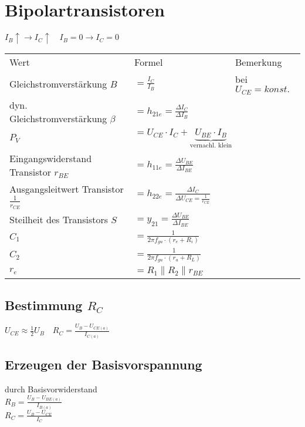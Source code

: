     \section{Bipolartransistoren}
    \noindent
    $I_B\uparrow\rightarrow I_C\uparrow\quad I_B=0\rightarrow I_C=0$
    \renewcommand{\arraystretch}{1.0}
    \begin{table}[H]
        \begin{tabularx}{\columnwidth}{l l l}
            Wert & Formel & Bemerkung \\
            Gleichstromverstärkung $B$ & $=\frac{I_C}{I_B}$ & bei $U_{CE}=konst.$ \\
            dyn. Gleichstromverstärkung $\beta$ & $=h_{21e}=\frac{\Delta I_C}{\Delta I_B}$ & \\
            $P_V$ & $=U_{CE}\cdot I_C + \underbrace{U_{BE}\cdot I_B}_\text{vernachl. klein}$ & \\
            Eingangswiderstand Transistor $r_{BE}$ & $=h_{11e}=\frac{\Delta U_{BE}}{\Delta I_{BE}}$ & \\
            Ausgangsleitwert Transistor $\frac{1}{r_{CE}}$ & $=h_{22e}=\frac{\Delta I_C}{\Delta U_{CE}=\frac{1}{r_{CE}}}$ & \\
            Steilheit des Transistors $S$ & $=y_{21}=\frac{\Delta U_{BE}}{\Delta I_{BE}}$ & \\
            $C_1$ & $=\frac{1}{2\pi f_{gu}\cdot (r_e+R_i)}$ & \\
            $C_2$ & $=\frac{1}{2\pi f_{gu}\cdot (r_a+R_L)}$ & \\
            $r_e$ & $=R_1\parallel R_2\parallel r_{BE}$
        \end{tabularx}
    \end{table}
    \subsection{Bestimmung $R_C$}
    $U_{CE}\approx \frac{1}{2}U_B\quad R_C=\frac{U_B-U_{CE(a)}}{I_{C(a)}}$

    \subsection{Erzeugen der Basisvorspannung}
    \begin{minipage}{0.5\columnwidth}
        durch Basisvorwiderstand\\
        $R_B=\frac{U_B-U_{BE(a)}}{I_{B(a)}}$\\ %
        $R_C=\frac{U_B-U_{CE}}{I_C}$
    \end{minipage}
    \begin{minipage}{0.5\columnwidth}
    \end{minipage}


